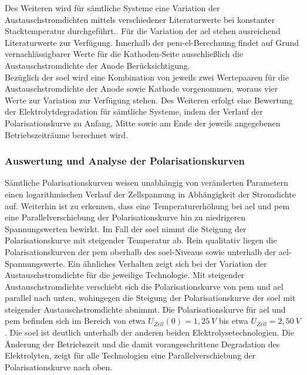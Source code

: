 \documentclass[onecolumn,10pt,titlepage]{article}
\begin{document}
Des Weiteren wird für sämtliche Systeme eine Variation der Austauschstromdichten mittels verschiedener Literaturwerte bei konstanter Stacktemperatur durchgeführt.. %
Für die Variation der \gls{ael} stehen ausreichend Literaturwerte zur Verfügung.
Innerhalb der \gls{pem}-\gls{el}-Berechnung findet auf Grund vernachlässigbarer Werte für die Kathoden-Seite ausschließlich die Austauschstromdichte der Anode Berücksichtigung.\\
 Bezüglich der \gls{soel} wird eine Kombination von jeweils zwei Wertepaaren für die Austauschstromdichte der Anode sowie Kathode vorgenommen, woraus vier Werte zur Variation zur Verfügung stehen.
Des Weiteren erfolgt eine Bewertung der Elektrolytdegradation für sämtliche Systeme, indem der Verlauf der Polarisationskurve zu Anfang, Mitte sowie am Ende der jeweils angegebenen Betriebszeiträume berechnet wird.\\


\subsubsection{Auswertung und Analyse der Polarisationskurven}
\label{subsub_polar}

Sämtliche Polarisationskurven weisen unabhängig von veränderten Parametern einen logarithmischen Verlauf der Zellspannung in Abhängigkeit der Stromdichte auf. Weiterhin ist zu erkennen, dass eine Temperaturerhöhung bei \gls{ael} und \gls{pem} eine Parallelverschiebung der Polarisationskurve hin zu niedrigeren Spannungswerten bewirkt. Im Fall der \gls{soel} nimmt die Steigung der Polarisationskurve mit steigender Temperatur ab. Rein qualitativ liegen die Polarisationskurven der \gls{pem} oberhalb des \gls{soel}-Niveaus sowie unterhalb der \gls{ael}-Spannungswerte. Ein ähnliches Verhalten zeigt sich bei der Variation der Austauschstromdichte für die jeweilige Technologie. Mit steigender Austauschstromdichte verschiebt sich die Polarisationskurve von \gls{pem} und \gls{ael} parallel nach unten, wohingegen die Steigung der Polarisationskurve der \gls{soel} mit steigender Austauschstromdichte abnimmt. Die Polarisationskurve für \gls{ael} und \gls{pem} befinden sich im Bereich von etwa $U_{Zell}(0)=1,25~V$ bis etwa $U_{Zell}=2,50~V$. Die \gls{soel} ist deutlich unterhalb der anderen beiden Elektrolysetechnologien.
Die Änderung der Betriebszeit und die damit vorangeschrittene Degradation des Elektrolyten, zeigt für alle Technologien eine Parallelverschiebung der Polarisationskurve nach oben.
\end{document}
